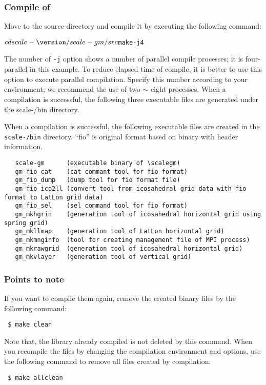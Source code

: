 \subsubsection{Compile of \scalegm} %

Move to the \scalegm source directory
and compile it by executing the following command:
\begin{alltt}
  $  cd scale-{\version}/scale-gm/src
  $  make -j 4
\end{alltt}

The number of \verb|-j| option shows a number of parallel compile processes;
it is four-parallel in this example.
To reduce elapsed time of compile,
it is better to use this option to execute parallel compilation.
Specify this number according to your environment;
we recommend the use of two $\sim$ eight processes.
When a compilation is successful,
the following three executable files are generated under the scale-{\version}/bin directory.

When a compilation is successful,
the following executable files are created in the \texttt{scale-{\version}/bin} directory.
``fio'' is original format based on binary with header information.
\begin{verbatim}
   scale-gm      (executable binary of \scalegm)
   gm_fio_cat    (cat commant tool for fio format)
   gm_fio_dump   (dump tool for fio format file)
   gm_fio_ico2ll (convert tool from icosahedral grid data with fio format to LatLon grid data)
   gm_fio_sel    (sel command tool for fio format)
   gm_mkhgrid    (generation tool of icosahedral horizontal grid using spring grid)
   gm_mkllmap    (generation tool of LatLon horizontal grid)
   gm_mkmnginfo  (tool for creating management file of MPI process)
   gm_mkrawgrid  (generation tool of icosahedral horizontal grid)
   gm_mkvlayer   (generation tool of vertical grid)
\end{verbatim}


\subsubsection{Points to note}

\noindent If you want to compile them again, remove the created binary files by the following command:
\begin{verbatim}
 $ make clean
\end{verbatim}
Note that, the library already compiled is not deleted by this command.
When you recompile the files by changing the compilation environment and options, use the following command to remove all files created by compilation:
\begin{verbatim}
 $ make allclean
\end{verbatim}


